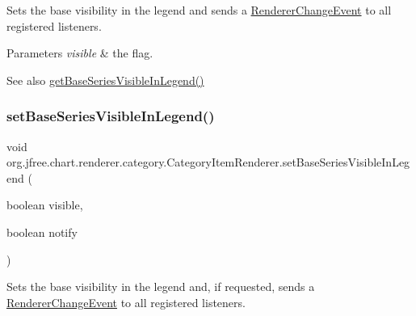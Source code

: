 Sets the base visibility in the legend and sends a \mbox{\hyperlink{}{Renderer\+Change\+Event}} to all registered listeners.


\begin{DoxyParams}{Parameters}
{\em visible} & the flag.\\
\hline
\end{DoxyParams}
\begin{DoxySeeAlso}{See also}
\mbox{\hyperlink{interfaceorg_1_1jfree_1_1chart_1_1renderer_1_1category_1_1_category_item_renderer_a5dbb34f875d6bbd46e99e3ec0d06f27c}{get\+Base\+Series\+Visible\+In\+Legend()}} 
\end{DoxySeeAlso}
\mbox{\label{interfaceorg_1_1jfree_1_1chart_1_1renderer_1_1category_1_1_category_item_renderer_a363fe4de50faa1bd160fd45979157be1}} 
\subsubsection{\texorpdfstring{set\+Base\+Series\+Visible\+In\+Legend()}{setBaseSeriesVisibleInLegend()}\hspace{0.1cm}{\footnotesize\ttfamily [2/2]}}
{\footnotesize\ttfamily void org.\+jfree.\+chart.\+renderer.\+category.\+Category\+Item\+Renderer.\+set\+Base\+Series\+Visible\+In\+Legend (\begin{DoxyParamCaption}\item[{boolean}]{visible,  }\item[{boolean}]{notify }\end{DoxyParamCaption})}

Sets the base visibility in the legend and, if requested, sends a \mbox{\hyperlink{}{Renderer\+Change\+Event}} to all registered listeners.


